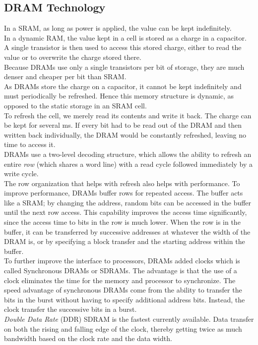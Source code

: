 \documentclass[12pt]{article}
\theoremstyle{definition}
\begin{document}
  \subsection{DRAM Technology}
  In a SRAM, as long as power is applied, the value can be kept indefinitely. \\
  In a dynamic RAM, the value kept in a cell is stored as a charge in a capacitor.
  A single transistor is then used to access this stored charge, either to read the value or to overwrite the charge stored there. \\
  Because DRAMs use only a single transistors per bit of storage, they are much denser and cheaper per bit than SRAM. \\
  As DRAMs store the charge on a capacitor, it cannot be kept indefinitely and must periodically be refreshed.
  Hence this memory structure is dynamic, as opposed to the static storage in an SRAM cell. \\

  To refresh the cell, we merely read its contents and write it back.
  The charge can be kept for several ms.
  If every bit had to be read out of the DRAM and then written back individually, the DRAM would be constantly refreshed, leaving no time to access it. \\
  DRAMs use a two-level decoding structure, which allows the ability to refresh an entire \emph{row} (which shares a word line) with a read cycle followed immediately by a write cycle. \\

  The row organization that helps with refresh also helps with performance.
  To improve performance, DRAMs buffer rows for repeated access.
  The buffer acts like a SRAM; by changing the address, random bits can be accessed in the buffer until the next row access.
  This capability improves the access time significantly, since the access time to bits in the row is much lower.
  When the row is in the buffer, it can be transferred by successive addresses at whatever the width of the DRAM is, or by specifying a block transfer and the starting address within the buffer. \\

  To further improve the interface to processors, DRAMs added clocks which is called Synchronous DRAMs or SDRAMs.
  The advantage is that the use of a clock eliminates the time for the memory and processor to synchronize.
  The speed advantage of synchronous DRAMs come from the ability to transfer the bits in the burst without having to specify additional address bits.
  Instead, the clock transfer the successive bits in a burst. \\
  \emph{Double Data Rate} (DDR) SDRAM is the fastest currently available.
  Data transfer on both the rising and falling edge of the clock, thereby getting twice as much bandwidth based on the clock rate and the data width. \\
\end{document}
